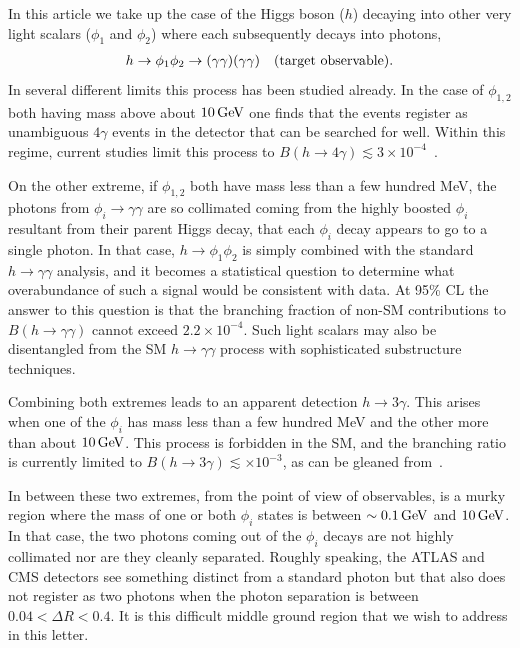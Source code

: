 \documentclass[letter,12pt]{article}
\def\bea{\begin{eqnarray}}
\def\eea{\end{eqnarray}}
\def\gev{\, {\rm GeV}}
\begin{document}
In this article we take up the case of the Higgs boson ($h$) decaying into other very light scalars ($\phi_1$ and $\phi_2$) where each subsequently decays into photons, 
\bea
h\to\phi_1\phi_2\to (\gamma\gamma)(\gamma\gamma)~~~{\rm (target~observable)}.
\label{eq:observable}
\eea
In several different limits this process has been studied already\cite{Dobrescu:2000jt,Draper:2012xt}. In the case of $\phi_{1,2}$ both having mass above about $10\gev$ one finds that the events register as unambiguous $4\gamma$ events in the detector that can be searched for well. Within this regime, current studies limit this process to $B(h\to 4\gamma)\lesssim 3\times 10^{-4}$~\cite{atlas_4_photon_search,Chang:2006bw}. 

On the other extreme, if $\phi_{1,2}$ both have mass less than a few hundred MeV, the photons from $\phi_i\to\gamma\gamma$ are so collimated coming from the highly boosted $\phi_i$ resultant from their parent Higgs decay, that each $\phi_i$ decay appears to go to a single photon. In that case, $h\to\phi_1\phi
_2$ is simply combined with the standard $h\to\gamma\gamma$ analysis, and it becomes a statistical question to determine what overabundance of such a signal would be consistent with data. At 95\% CL the answer to this question is that the branching fraction of non-SM contributions to $B(h\to\gamma\gamma)$ cannot exceed $2.2\times10^{-4}$\cite{PDG}. Such light scalars may also be disentangled from the SM $h\to\gamma\gamma$ process with sophisticated substructure techniques\cite{photon_jets,ATLAS:2012soa}.

Combining both extremes leads to an apparent detection $h\to 3\gamma$. This arises when one of the $\phi_i$ has mass less than a few hundred MeV and the other more than about $10\gev$. This process is forbidden in the SM, and the branching ratio is currently limited to $B(h\to 3\gamma)\lesssim \times 10^{-3}$, as can be gleaned from~\cite{chawdhry_nnlo_2020}.

In between these two extremes, from the point of view of observables, is a murky region where the mass of one or both $\phi_i$ states is between $\sim 0.1\gev$ and $10\gev$. In that case, the two photons coming out of the $\phi_i$ decays are not highly collimated nor are they cleanly separated. Roughly speaking, the ATLAS and CMS detectors see something distinct from a standard photon but that also does not register as two photons when the photon separation is between $0.04<\Delta R<0.4$\cite{Aaboud:2018djx,atlas_photon_efficiency}.  It is this difficult middle ground region that we wish to address in this letter.
\end{document}
